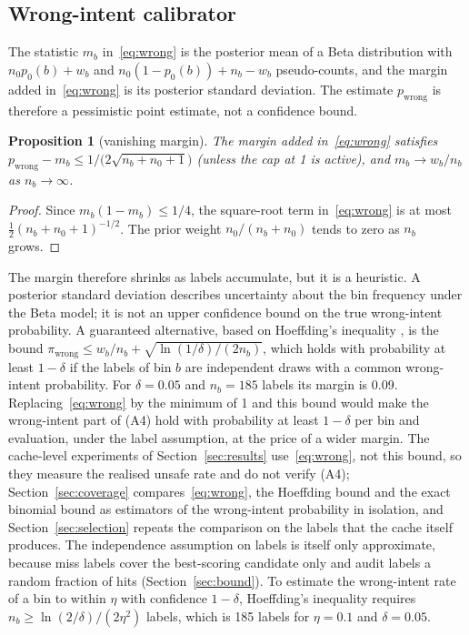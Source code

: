 \documentclass[journal]{IEEEtran}
\newtheorem{proposition}{Proposition}
\begin{document}
\subsection{Wrong-intent calibrator}\label{sec:calibtheory}
The statistic $m_b$ in~\eqref{eq:wrong} is the posterior mean of a Beta distribution with $n_0p_0(b)+w_b$ and $n_0(1-p_0(b))+n_b-w_b$ pseudo-counts, and the margin added in~\eqref{eq:wrong} is its posterior standard deviation. The estimate $p_{\text{wrong}}$ is therefore a pessimistic point estimate, not a confidence bound.

\begin{proposition}[vanishing margin]\label{prop:margin}
The margin added in~\eqref{eq:wrong} satisfies $p_{\text{wrong}}-m_b\le 1/\big(2\sqrt{n_b+n_0+1}\big)$ (unless the cap at 1 is active), and $m_b\to w_b/n_b$ as $n_b\to\infty$.
\end{proposition}
\begin{proof}
Since $m_b(1-m_b)\le 1/4$, the square-root term in~\eqref{eq:wrong} is at most $\tfrac12(n_b+n_0+1)^{-1/2}$. The prior weight $n_0/(n_b+n_0)$ tends to zero as $n_b$ grows.
\end{proof}
The margin therefore shrinks as labels accumulate, but it is a heuristic. A posterior standard deviation describes uncertainty about the bin frequency under the Beta model; it is not an upper confidence bound on the true wrong-intent probability. A guaranteed alternative, based on Hoeffding's inequality \cite{hoeffding1963}, is the bound $\pi_{\text{wrong}}\le w_b/n_b+\sqrt{\ln(1/\delta)/(2n_b)}$, which holds with probability at least $1-\delta$ if the labels of bin $b$ are independent draws with a common wrong-intent probability. For $\delta=0.05$ and $n_b=185$ labels its margin is 0.09. Replacing~\eqref{eq:wrong} by the minimum of 1 and this bound would make the wrong-intent part of (A4) hold with probability at least $1-\delta$ per bin and evaluation, under the label assumption, at the price of a wider margin. The cache-level experiments of Section~\ref{sec:results} use~\eqref{eq:wrong}, not this bound, so they measure the realised unsafe rate and do not verify (A4); Section~\ref{sec:coverage} compares~\eqref{eq:wrong}, the Hoeffding bound and the exact binomial bound as estimators of the wrong-intent probability in isolation, and Section~\ref{sec:selection} repeats the comparison on the labels that the cache itself produces. The independence assumption on labels is itself only approximate, because miss labels cover the best-scoring candidate only and audit labels a random fraction of hits (Section~\ref{sec:bound}). To estimate the wrong-intent rate of a bin to within $\eta$ with confidence $1-\delta$, Hoeffding's inequality requires $n_b\ge\ln(2/\delta)/(2\eta^2)$ labels, which is 185 labels for $\eta=0.1$ and $\delta=0.05$.
\end{document}
